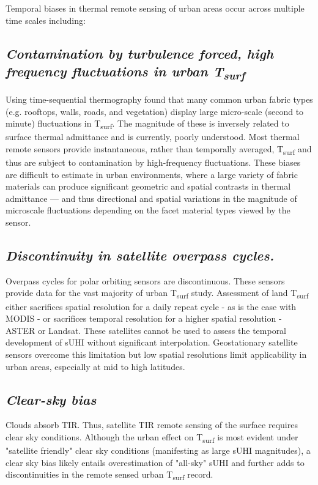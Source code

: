 \begin{bibunit}
Temporal biases in thermal remote sensing of urban areas occur across multiple time scales including: 
\subsection*{\textnormal{\textit{Contamination by turbulence forced, high frequency fluctuations in urban T\textsubscript{surf}}}}

Using time-sequential thermography \citet{Christen2012} found that many common urban fabric types (e.g. rooftops, walls, roads, and vegetation) display large micro-scale (second to minute) fluctuations in T\textsubscript{surf}. The magnitude of these is inversely related to surface thermal admittance and is currently, poorly understood. Most thermal remote sensors provide instantaneous, rather than temporally averaged, T\textsubscript{surf} and thus are subject to contamination by high-frequency fluctuations. These biases are difficult to estimate in urban environments, where a large variety of fabric materials can produce significant geometric and spatial contrasts in thermal admittance --- and thus directional and spatial variations in the magnitude of microscale fluctuations depending on the facet material types viewed by the sensor. 

\subsection*{\textnormal{\textit{Discontinuity in satellite overpass cycles.}}}

Overpass cycles for polar orbiting sensors are discontinuous. These sensors provide data for the vast majority of urban T\textsubscript{surf} study. Assessment of land T\textsubscript{surf} either sacrifices spatial resolution for a daily repeat cycle - as is the case with MODIS  - or sacrifices temporal resolution for a higher spatial resolution - ASTER or Landsat. These satellites cannot be used to assess the temporal development of sUHI without significant interpolation. Geostationary satellite sensors overcome this limitation but low spatial resolutions limit applicability in urban areas, especially at mid to high latitudes. 

\subsection*{\textnormal{\textit{Clear-sky bias}}}

Clouds absorb TIR. Thus, satellite TIR remote sensing of the surface requires clear sky conditions. Although the urban effect on T\textsubscript{surf} is most evident under "satellite friendly" clear sky conditions (manifesting as large sUHI magnitudes), a clear sky bias likely entails overestimation of "all-sky" sUHI and further adds to discontinuities in the remote sensed urban T\textsubscript{surf} record.


\end{bibunit}
